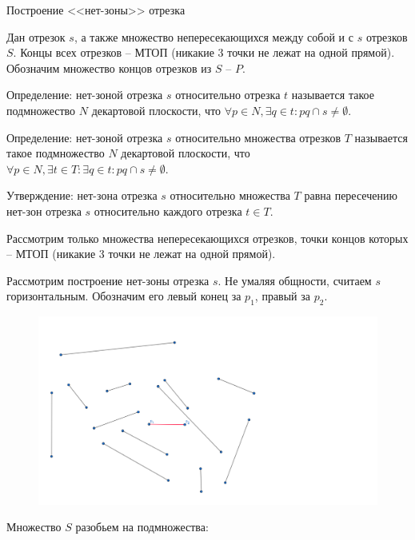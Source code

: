 \documentclass[letterpaper,12pt]{article}
\begin{document}
\begin{center}
Построение <<нет-зоны>> отрезка
\end{center}

Дан отрезок $s$, а также множество непересекающихся между
собой и с $s$ отрезков $S$. Концы всех отрезков -- МТОП
(никакие 3 точки не лежат на одной прямой). Обозначим множество 
концов отрезков из $S$ -- $P$.

Определение: нет-зоной отрезка $s$ относительно отрезка $t$
называется такое подмножество $N$ декартовой плоскости, что
$\forall p \in N, \exists q \in t : pq \cap s \neq \emptyset$.

Определение: нет-зоной отрезка $s$ относительно множества 
отрезков $T$ называется такое подмножество $N$ декартовой
плоскости, что $\forall p \in N, \exists t \in T : \exists q 
\in t : pq \cap s \neq \emptyset$.

Утверждение: нет-зона отрезка $s$ относительно множества $T$ равна
пересечению нет-зон отрезка $s$ относительно 
каждого отрезка $t \in T$.

Рассмотрим только множества непересекающихся отрезков, точки
концов которых -- МТОП (никакие 3 точки не лежат на одной прямой).

Рассмотрим построение нет-зоны отрезка $s$. Не умаляя общности,
считаем $s$ горизонтальным. Обозначим его левый конец за $p_1$,
правый за $p_2$. 

\begin{figure}[H]
      \centering
      \includegraphics[width=0.5\linewidth]{segments_def.png}
\end{figure}

Множество $S$ разобьем на подмножества:
\end{document}
